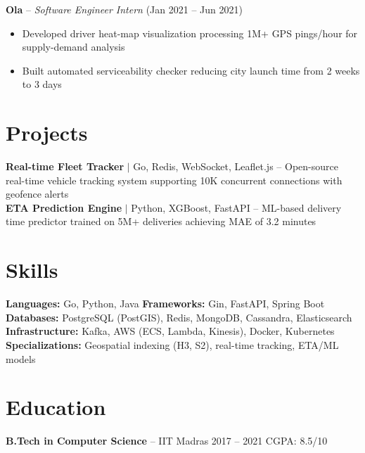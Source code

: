 \documentclass[10pt,a4paper]{article}
\begin{document}
\textbf{Ola} -- \textit{Software Engineer Intern} (Jan 2021 -- Jun 2021)
\begin{itemize}
    \item Developed driver heat-map visualization processing 1M+ GPS pings/hour for supply-demand analysis
    \item Built automated serviceability checker reducing city launch time from 2 weeks to 3 days
\end{itemize}

\section{Projects}

\textbf{Real-time Fleet Tracker} {\small$\mid$ Go, Redis, WebSocket, Leaflet.js} -- Open-source real-time vehicle tracking system supporting 10K concurrent connections with geofence alerts\\[3pt]
\textbf{ETA Prediction Engine} {\small$\mid$ Python, XGBoost, FastAPI} -- ML-based delivery time predictor trained on 5M+ deliveries achieving MAE of 3.2 minutes

\section{Skills}

{\small
\textbf{Languages:} Go, Python, Java \quad \textbf{Frameworks:} Gin, FastAPI, Spring Boot\\
\textbf{Databases:} PostgreSQL (PostGIS), Redis, MongoDB, Cassandra, Elasticsearch\\
\textbf{Infrastructure:} Kafka, AWS (ECS, Lambda, Kinesis), Docker, Kubernetes\\
\textbf{Specializations:} Geospatial indexing (H3, S2), real-time tracking, ETA/ML models
}

\section{Education}

\textbf{B.Tech in Computer Science} -- IIT Madras \hfill 2017 -- 2021 \quad CGPA: 8.5/10
\end{document}
